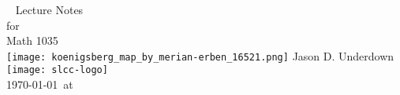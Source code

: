 \begin{titlepage}
  {~}
  \centering
  {\Huge Lecture Notes}\\[\baselineskip]
  {\LARGE for}\\[\baselineskip]
  {\Huge Math 1035}\\
  \vfill
  {\texttt{[image: koenigsberg\_map\_by\_merian-erben\_16521.png]}}
  \vfill
  {\Large Jason D. Underdown}\\[\baselineskip]
  {\texttt{[image: slcc-logo]}}\\[\baselineskip]
  {\large \today\ at \DTMcurrenttime{} }\\
\end{titlepage}


